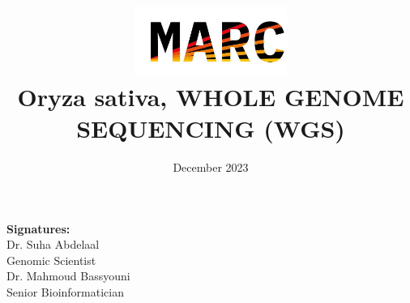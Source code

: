 \documentclass[11pt]{article}
\title{\includegraphics[width=5cm]{Figures/image.png} \\Oryza sativa, WHOLE GENOME SEQUENCING (WGS)\\[1ex] \large }
\date{December 2023}
\begin{document}
\maketitle

\vspace{10cm} %
\vspace{1cm} %
\noindent \textbf{Signatures:}\\
\noindent Dr. Suha Abdelaal \dotfill\\
\noindent Genomic Scientist\\[2ex] %
\noindent Dr. Mahmoud Bassyouni \dotfill\\
\noindent Senior Bioinformatician

\newpage %
\tableofcontents

\newpage %
\listoffigures

\newpage %
\listoftables
\cleardoublepage %




\newpage

\newpage

\newpage

\newpage


\newpage
{} %
\end{document}
